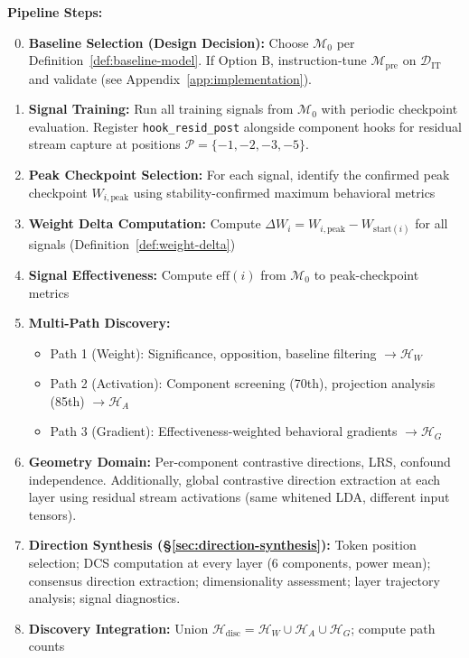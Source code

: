 \documentclass[11pt]{article}
\begin{document}
\noindent\textbf{Pipeline Steps:}
\begin{enumerate}[nosep]
\setcounter{enumi}{-1}
\item \textbf{Baseline Selection (Design Decision):} Choose $\mathcal{M}_0$ per Definition~\ref{def:baseline-model}. If Option B, instruction-tune $\mathcal{M}_{\text{pre}}$ on $\mathcal{D}_{\text{IT}}$ and validate (see Appendix~\ref{app:implementation}).
\item \textbf{Signal Training:} Run all training signals from $\mathcal{M}_0$ with periodic checkpoint evaluation. Register \texttt{hook\_resid\_post} alongside component hooks for residual stream capture at positions $\mathcal{P} = \{-1,-2,-3,-5\}$.
\item \textbf{Peak Checkpoint Selection:} For each signal, identify the confirmed peak checkpoint $W_{i,\text{peak}}$ using stability-confirmed maximum behavioral metrics
\item \textbf{Weight Delta Computation:} Compute $\Delta W_i = W_{i,\text{peak}} - W_{\text{start}(i)}$ for all signals (Definition~\ref{def:weight-delta})
\item \textbf{Signal Effectiveness:} Compute $\text{eff}(i)$ from $\mathcal{M}_0$ to peak-checkpoint metrics
\item \textbf{Multi-Path Discovery:}
\begin{itemize}[nosep]
\item Path 1 (Weight): Significance, opposition, baseline filtering $\to \mathcal{H}_W$
\item Path 2 (Activation): Component screening (70th), projection analysis (85th) $\to \mathcal{H}_A$
\item Path 3 (Gradient): Effectiveness-weighted behavioral gradients $\to \mathcal{H}_G$
\end{itemize}
\item \textbf{Geometry Domain:} Per-component contrastive directions, LRS, confound independence. Additionally, global contrastive direction extraction at each layer using residual stream activations (same whitened LDA, different input tensors).
\item[6.5] \textbf{Direction Synthesis (\S\ref{sec:direction-synthesis}):} Token position selection; DCS computation at every layer (6 components, power mean); consensus direction extraction; dimensionality assessment; layer trajectory analysis; signal diagnostics.
\item \textbf{Discovery Integration:} Union $\mathcal{H}_{\text{disc}} = \mathcal{H}_W \cup \mathcal{H}_A \cup \mathcal{H}_G$; compute path counts

\end{enumerate}
\end{document}
